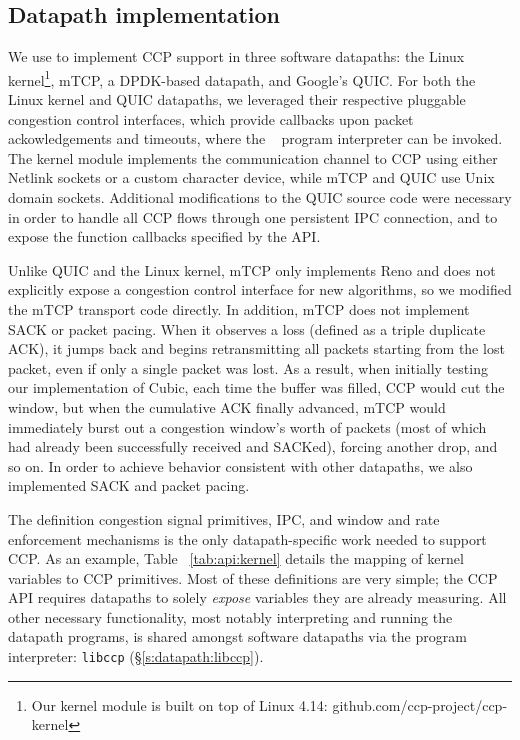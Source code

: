 \subsection{Datapath implementation}
\label{s:datapath:software_datapaths}
We use  to implement CCP support in three software datapaths: the Linux kernel\footnote{Our kernel module is built on top of Linux 4.14: github.com/ccp-project/ccp-kernel}, mTCP, a DPDK-based datapath, and Google's QUIC.
For both the Linux kernel and QUIC datapaths, we leveraged their respective pluggable congestion control interfaces, which provide callbacks upon packet ackowledgements and timeouts, where the ~ program interpreter can be invoked.
The kernel module implements the communication channel to CCP using either Netlink sockets or a custom
character device, while mTCP and QUIC use Unix domain sockets.
Additional modifications to the QUIC source code were necessary in order to handle all CCP flows through one persistent IPC connection, and to expose the function callbacks specified by the  API.

Unlike QUIC and the Linux kernel, mTCP only implements Reno and does not explicitly expose a congestion control interface for new algorithms, so we modified the mTCP transport code directly.
In addition, mTCP does not implement SACK or packet pacing.
When it observes a loss (defined as a
triple duplicate ACK), it jumps back and begins retransmitting all packets starting from the lost packet, even if only a
single packet was lost.
As a result, when initially testing our implementation of Cubic, each time the buffer was filled, CCP
would cut the window, but when the cumulative ACK finally advanced, mTCP would immediately burst out a congestion window’s worth of packets (most of which had already been successfully received and SACKed), forcing another drop, and so on.
In order to achieve behavior consistent with other datapaths, we also implemented SACK and packet pacing.

The definition congestion signal primitives, IPC, and window and rate enforcement mechanisms is the only datapath-specific
work needed to support CCP.
As an example, Table ~\ref{tab:api:kernel} details the mapping of kernel variables to CCP primitives.
Most of these definitions are very simple; the CCP API requires datapaths to solely \textit{expose} variables they are already measuring.
All other necessary functionality, most notably interpreting and running the datapath programs, is shared amongst software datapaths via the program interpreter: \texttt{libccp} (\S\ref{s:datapath:libccp}).

